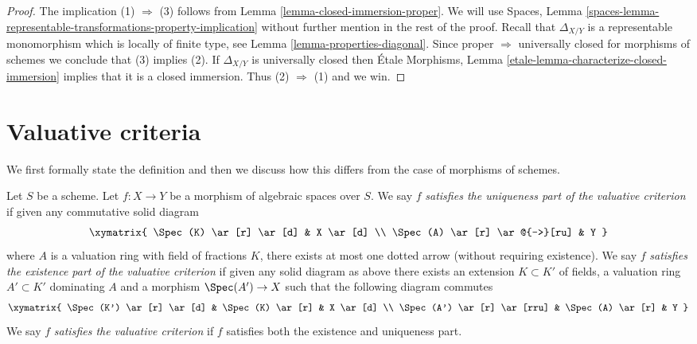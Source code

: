 \begin{proof}
The implication (1) $\Rightarrow$ (3) follows from
Lemma \ref{lemma-closed-immersion-proper}.
We will use
Spaces, Lemma
\ref{spaces-lemma-representable-transformations-property-implication}
without further mention in the rest of the proof.
Recall that $\Delta_{X/Y}$ is a representable
monomorphism which is locally of finite type, see
Lemma \ref{lemma-properties-diagonal}.
Since proper $\Rightarrow$ universally closed for morphisms of schemes
we conclude that (3) implies (2).
If $\Delta_{X/Y}$ is universally closed then
\'Etale Morphisms,
Lemma \ref{etale-lemma-characterize-closed-immersion}
implies that it is a closed immersion. Thus (2) $\Rightarrow$ (1)
and we win.
\end{proof}





\section{Valuative criteria}
\label{section-valuative}

\noindent
We first formally state the definition and then we discuss how this
differs from the case of morphisms of schemes.

\begin{definition}
\label{definition-valuative-criterion}
Let $S$ be a scheme.
Let $f : X \to Y$ be a morphism of algebraic spaces over $S$.
We say $f$ {\it satisfies the uniqueness part of the valuative criterion}
if given any commutative solid diagram
$$
\xymatrix{
\Spec(K) \ar[r] \ar[d] & X \ar[d] \\
\Spec(A) \ar[r] \ar@{-->}[ru] & Y
}
$$
where $A$ is a valuation ring with field of fractions $K$, there exists
at most one dotted arrow (without requiring existence).
We say $f$ {\it satisfies the existence part of the valuative criterion}
if given any solid diagram as above there exists an extension
$K \subset K'$ of fields, a valuation ring $A' \subset K'$ dominating
$A$ and a morphism $\Spec(A') \to X$ such that the following
diagram commutes
$$
\xymatrix{
\Spec(K') \ar[r] \ar[d] & \Spec(K) \ar[r] & X \ar[d] \\
\Spec(A') \ar[r] \ar[rru] & \Spec(A) \ar[r] & Y
}
$$
We say $f$ {\it satisfies the valuative criterion}
if $f$ satisfies both the existence and uniqueness part.
\end{definition}

